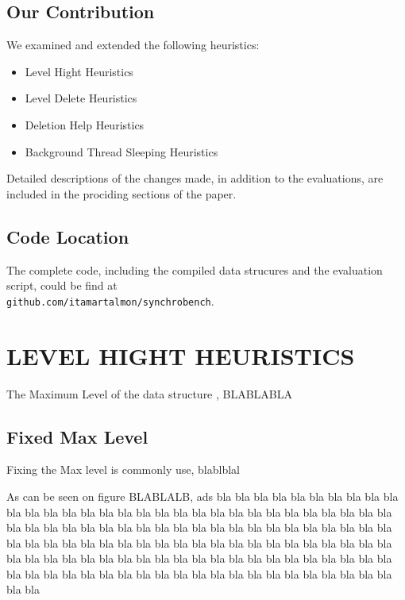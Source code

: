 \documentclass{article}
\begin{document}
\subsection{Our Contribution}
\label{ssec:oc}

We examined and extended the following heuristics:

\begin{itemize}
	\item Level Hight Heuristics
	\item Level Delete Heuristics 
	\item Deletion Help Heuristics
	\item Background Thread Sleeping Heuristics 
\end{itemize}

\hfill \break
Detailed descriptions of the changes made, in addition to the evaluations, are included in the prociding sections of the paper.

\subsection{Code Location}
\label{ssec:cl}
The complete code, including the compiled data strucures and the evaluation script, could be find at \\\texttt{github.com/itamartalmon/synchrobench}.

\section{LEVEL HIGHT HEURISTICS}
\label{sec:lhh}

The Maximum Level of the data structure , BLABLABLA

\subsection{Fixed Max Level}
\label{ssec:fml}

Fixing the Max level is commonly use, blablblal

As can be seen on figure BLABLALB, ads
bla bla bla bla bla bla
bla bla bla bla bla 
bla bla bla bla bla bla
bla bla bla bla bla 
bla bla bla bla bla bla
bla bla bla bla bla 
bla bla bla bla bla bla
bla bla bla bla bla bla
bla bla bla bla bla 
bla bla bla bla bla bla
bla bla bla bla bla 
bla bla bla bla bla bla
bla bla bla bla bla 
bla bla bla bla bla bla
bla bla bla bla bla bla
bla bla bla bla bla 
bla bla bla bla bla bla
bla bla bla bla bla 
bla bla bla bla bla bla
bla bla bla bla bla 
bla bla bla bla bla bla
\end{document}
